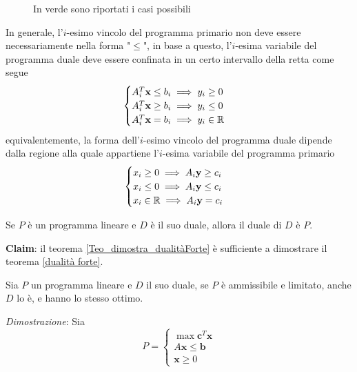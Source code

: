 \documentclass[10pt, letterpaper]{report}
\begin{document}
\begin{figure}[h]
    \caption{In verde sono riportati i casi possibili}
\end{figure}

In generale, l'$i$-esimo vincolo del programma primario non deve essere necessariamente nella forma "$\le$", in base a questo, l'$i$-esima variabile del programma duale deve essere confinata in un certo intervallo della retta come segue$$
\begin{cases}
    A_i^T\mathbf x\le b_i \implies y_i \ge 0\\
    A_i^T\mathbf x\ge b_i \implies y_i \le 0\\
    A_i^T\mathbf x= b_i \implies y_i \in {\mathbb R}
\end{cases}$$
equivalentemente, la forma dell'$i$-esimo vincolo del programma duale dipende dalla regione alla quale appartiene l'$i$-esima variabile del programma primario 
$$\begin{cases}
    x_i \ge 0 \implies A_i\mathbf y \ge c_i\\ 
    x_i \le 0 \implies A_i\mathbf y \le c_i\\ 
    x_i \in {\mathbb R}\implies A_i\mathbf y = c_i
\end{cases}$$
\begin{proposizione}
    Se $P$ è un programma lineare e $D$ è il suo duale, allora il duale di $D$ è $P$.
\end{proposizione}
\textbf{Claim}: il teorema \ref{Teo_dimostra_dualitàForte} è sufficiente a dimostrare il teorema \ref{dualità forte}.  
\begin{teorema}\label{Teo_dimostra_dualitàForte}
    Sia $P$ un programma lineare e $D$ il suo duale, se $P$ è ammissibile e limitato, anche $D$ lo è, e hanno lo stesso ottimo.
\end{teorema}
\textit{Dimostrazione}: Sia 
$$ P=\begin{cases}
    \max \mathbf c^T\mathbf x\\ 
        A\mathbf x \le \mathbf b \\ 
        \mathbf x \ge 0 
\end{cases}$$
\end{document}
